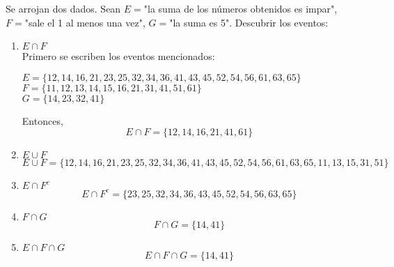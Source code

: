\item Se arrojan dos dados. Sean $E=$"la suma de los números obtenidos es impar", $F=$"sale el 1 al menos una vez", $G=$"la suma es 5". Descubrir los eventos:
    \begin{enumerate}
        \item $E\cap F$\e\\
            Primero se escriben los eventos mencionados:
            \begin{center}
                $E=\{12,14,16,21,23,25,32,34,36,41,43,45,52,54,56,61,63,65\}$\\
                $F=\{11,12,13,14,15,16,21,31,41,51,61\}$\\
                $G=\{14,23,32,41\}$
            \end{center}
            Entonces,
            \[E\cap F=\{12,14,16,21,41,61\}\]
        \item $E\cup F$
            \[E\cup F=\{12,14,16,21,23,25,32,34,36,41,43,45,52,54,56,61,63,65,11,13,15,31,51\}\]
        \item $E\cap F^c$
            \[E\cap F^c=\{23,25,32,34,36,43,45,52,54,56,63,65\}\]
        \item $F\cap G$
            \[F\cap G=\{14,41\}\]
        \item $E\cap F\cap G$
            \[E\cap F\cap G=\{14,41\}\]
    \end{enumerate}